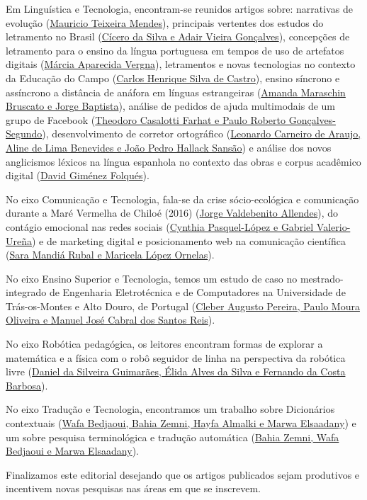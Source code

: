 \documentclass{textolivre}
\begin{document}
Em Linguística e Tecnologia, encontram-se reunidos artigos sobre: narrativas de evolução (\href{https://doi.org/10.35699/1983-3652.2021.26711}{Mauricio Teixeira Mendes}), principais vertentes dos estudos do letramento no Brasil (\href{https://doi.org/10.35699/1983-3652.2021.29164}{Cícero da Silva e Adair Vieira Gonçalves}), concepções de letramento para o ensino da língua portuguesa em tempos de uso de artefatos digitais (\href{https://doi.org/10.35699/1983-3652.2021.24366}{Márcia Aparecida Vergna}), letramentos e novas tecnologias no contexto da Educação do Campo (\href{https://doi.org/10.35699/1983-3652.2021.26765}{Carlos Henrique Silva de Castro}), ensino síncrono e assíncrono a distância de anáfora em línguas estrangeiras (\href{https://doi.org/10.35699/1983-3652.2021.29177}{Amanda Maraschin Bruscato e Jorge Baptista}), análise de pedidos de ajuda multimodais de um grupo de Facebook (\href{https://doi.org/10.35699/1983-3652.2021.24391}{Theodoro Casalotti Farhat e Paulo Roberto Gonçalves-Segundo}), desenvolvimento de corretor ortográfico (\href{https://doi.org/10.35699/1983-3652.2021.26469}{Leonardo Carneiro de Araujo, Aline de Lima Benevides e João Pedro Hallack Sansão}) e análise dos novos anglicismos léxicos na língua espanhola no contexto das obras e corpus acadêmico digital (\href{https://doi.org/10.35699/1983-3652.2021.24418}{David Giménez Folqués}).

No eixo Comunicação e Tecnologia, fala-se da crise sócio-ecológica e comunicação durante a Maré Vermelha de Chiloé (2016) (\href{https://doi.org/10.35699/1983-3652.2021.26231}{Jorge Valdebenito Allendes}), do contágio emocional nas redes sociais (\href{https://doi.org/10.35699/1983-3652.2021.29080}{Cynthia Pasquel-López e Gabriel Valerio-Ureña}) e de marketing digital e posicionamento web na comunicação científica (\href{	https://doi.org/10.35699/1983-3652.2021.26251}{Sara Mandiá Rubal e Maricela López Ornelas}).

No eixo Ensino Superior e Tecnologia, temos um estudo de caso no mestrado-integrado de Engenharia Eletrotécnica e de Computadores na Universidade de Trás-os-Montes e Alto Douro, de Portugal (\href{https://doi.org/10.35699/1983-3652.2021.26709}{Cleber Augusto Pereira, Paulo Moura Oliveira e Manuel José Cabral dos Santos Reis}).
	
No eixo Robótica pedagógica, os leitores encontram formas de explorar a matemática e a física com o robô seguidor de linha na perspectiva da robótica livre (\href{https://doi.org/10.35699/1983-3652.2021.24895}{Daniel da Silveira Guimarães, Élida Alves da Silva e Fernando da Costa Barbosa}).

No eixo Tradução e Tecnologia, encontramos um trabalho sobre Dicionários contextuais (\href{https://doi.org/10.35699/1983-3652.2021.26501}{Wafa Bedjaoui, Bahia Zemni, Hayfa Almalki e Marwa Elsaadany}) e um sobre pesquisa terminológica e tradução automática (\href{https://doi.org/10.35699/1983-3652.2021.26501}{Bahia Zemni, Wafa Bedjaoui e Marwa Elsaadany}).
	
Finalizamos este editorial desejando que os artigos publicados sejam produtivos e incentivem novas pesquisas nas áreas em que se inscrevem.
\end{document}
